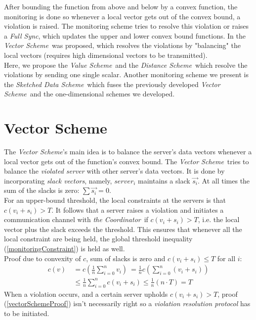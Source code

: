 \documentclass[10pt, conference]{IEEEtran}
\newcommand{\vectorScheme}{\textit{Vector Scheme}}
\newcommand{\valueScheme}{\textit{Value Scheme}}
\newcommand{\distanceScheme}{\textit{Distance Scheme}}
\newcommand{\sketchScheme}{\textit{Sketched Data Scheme}}
\newcommand{\fullSync}{\textit{Full Sync}}
\newcommand{\theCoordinator}{\textit{the Coordinator}}
\begin{document}
After bounding the function from above and below by a convex function, the monitoring is done so whenever a local vector gets out of the convex bound, a violation is raised. The monitoring scheme tries to resolve this violation or raises a \fullSync , which updates the upper and lower convex bound functions.
In \cite{lazerson2018lightweight} the \vectorScheme \ was proposed, which resolves the violations by "balancing" the local vectors (requires high dimensional vectors to be transmitted). \\
Here, we propose the \valueScheme \ and the \distanceScheme \ which resolve the violations by sending one single scalar. Another monitoring scheme we present is the \sketchScheme \ which fuses the previously developed \vectorScheme \ and the one-dimensional schemes we developed.

\section{Vector Scheme}
The \vectorScheme 's main idea is to balance the server's data vectors whenever a local vector gets out of the function's convex bound. The \vectorScheme \ tries to balance the \textit{violated server} with other server's data vectors. It is done by incorporating \textit{slack vectors}, namely, $server_i$ maintains a slack $\overrightarrow{s_i}$. At all times the sum of the slacks is zero: ${\sum{\overrightarrow{s_i}} = 0}$. \\
For an upper-bound threshold, the local constraints at the servers is that ${c(v_i+s_i) > T}$. It follows that a server raises a violation and initiates a communication channel with \theCoordinator \ if ${c(v_i+s_i) > T}$, i.e. the local vector plus the slack exceeds the threshold. This ensures that whenever all the local constraint are being held, the global threshold inequality (\ref{monitoringConstraint}) is held as well.\\
Proof due to convexity of $c$, sum of slacks is zero and ${c(v_i+s_i) \leq T}$ for all $i$:
\begin{equation}
\label{vectorSchemeProof}
\begin{aligned}
 c(v)  \
	   &=  c\left(\frac{1}{n} \sum\limits_{i=0}^{n}{v_i}\right)  \
        =  \frac{1}{n} c\left(\sum\limits_{i=0}^{n}{(v_i + s_i)}\right) \\
      &\leq   \frac{1}{n} \sum\limits_{i=0}^{n}{c(v_i + s_i)}
       \leq   \frac{1}{n}(n \cdot T)
       = T
\end{aligned}
\end{equation}
When a violation occurs, and a certain server upholds ${c(v_i+s_i) > T}$, proof (\ref{vectorSchemeProof}) isn't necessarily right so a \textit{violation resolution protocol} has to be initiated.
\end{document}
